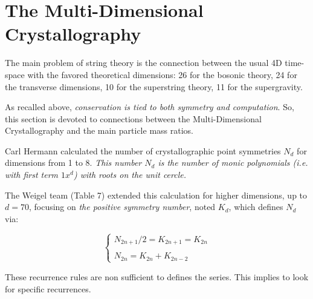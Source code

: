 \documentclass[a4paper,9pt]{article}
\begin{document}
\section{The Multi-Dimensional Crystallography}

The main problem of string theory is the connection between the usual 4D time-space with the favored theoretical dimensions: 26 for the bosonic theory, 24 for the transverse dimensions, 10 for the superstring theory, 11 for the supergravity. 

As recalled above, \textit{conservation is tied to both symmetry and computation}. So, this section is devoted to connections between the Multi-Dimensional Crystallography and the main particle mass ratios.

Carl Hermann \cite {Hermann} calculated the number of crystallographic point symmetries $N_d$ for dimensions from 1 to 8. \textit{This number $N_d$ is the number of monic polynomials (i.e. with first term $1x^d$) with roots on the unit cercle.}


The Weigel team\cite{Weigel} (Table 7) extended this calculation for higher dimensions, up to $d=70$, focusing on \textit{the positive symmetry number}, noted $K_{d}$, which defines $N_d$ via: 

\begin{equation}
 \left\{
    \begin{array}{ll}
            N_{2n+1}/2 =  K_{2n+1} =  K_{2n} \\
            \\
          N_{2n} = K_{2n} + K_{2n-2}
    \end{array}
\right.
\end{equation}

These recurrence rules are non sufficient to defines the series. This implies to look for specific recurrences.
\end{document}
